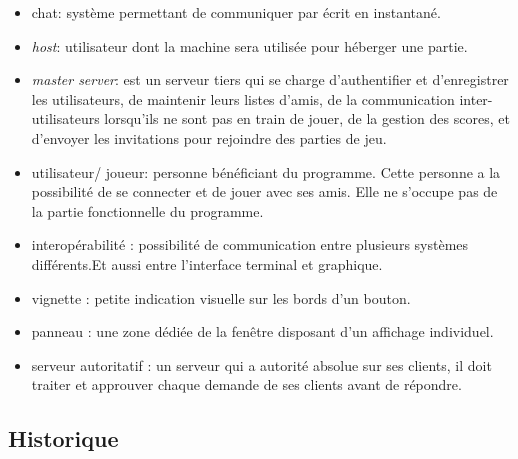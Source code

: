 \documentclass[a4paper,10pt]{article}
\begin{document}
\begin{itemize}
    \item chat: système permettant de communiquer par écrit en instantané.
	\item \textit{host}: utilisateur dont la machine sera utilisée pour héberger une partie.
	\item  \textit{master server}: est un serveur tiers qui se charge d'authentifier et d'enregistrer les utilisateurs, de maintenir leurs listes d'amis, de la communication inter-utilisateurs lorsqu'ils ne sont pas en train de jouer, de la gestion des scores, et d'envoyer les invitations pour rejoindre des parties de jeu.
	\item utilisateur/ joueur: personne bénéficiant du programme. Cette personne a la possibilité de se connecter et de jouer avec ses amis. Elle ne s'occupe pas de la partie fonctionnelle du programme.
	\item interopérabilité : possibilité de communication entre plusieurs systèmes différents.Et aussi entre l'interface terminal et graphique.
	\item vignette : petite indication visuelle sur les bords d'un bouton. 
	\item panneau : une zone dédiée de la fenêtre disposant d'un affichage individuel.
	\item serveur autoritatif : un serveur qui a autorité absolue sur ses clients, il doit traiter et approuver chaque demande de ses clients avant de répondre.
\end{itemize}

\newpage

\subsection{Historique}
\end{document}
